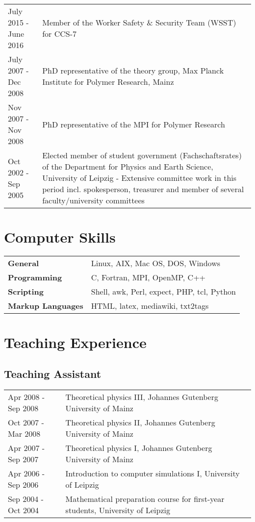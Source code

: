 \documentclass{article}
\begin{document}
\begin{tabular}{p{}p{}}
July 2015 - June 2016 & Member of the Worker Safety \& Security Team (WSST) for CCS-7 \\
July 2007 - Dec 2008 & PhD representative of the theory group, Max Planck Institute for Polymer Research, Mainz \\
Nov 2007 - Nov 2008 & PhD representative of the MPI for Polymer Research \\
Oct 2002 - Sep 2005 & Elected member of student government (Fachschaftsrates) of the Department for Physics and Earth Science, University of Leipzig - Extensive committee work in this period incl. spokesperson, treasurer and member of several faculty/university committees \\
\end{tabular}


\section*{Computer Skills}

\begin{tabular}{ll}
\textbf{General} & Linux, AIX, Mac OS, DOS, Windows \\
\textbf{Programming} & C, Fortran, MPI, OpenMP, C++ \\
\textbf{Scripting} & Shell, awk, Perl, expect, PHP, tcl, Python\\
\textbf{Markup Languages} & HTML, latex, mediawiki, txt2tags \\
\end{tabular}

\section*{Teaching Experience}

\subsection*{Teaching Assistant}

\begin{tabular}{p{}p{}}
Apr 2008 - Sep 2008 & Theoretical physics III, Johannes Gutenberg University of Mainz \\
Oct 2007 - Mar 2008 & Theoretical physics II, Johannes Gutenberg University of Mainz \\
Apr 2007 - Sep 2007 & Theoretical physics I, Johannes Gutenberg University of Mainz \\
Apr 2006 - Sep 2006 & Introduction to computer simulations I, University of Leipzig \\
Sep 2004 - Oct 2004 & Mathematical preparation course for first-year students, University of Leipzig \\
\end{tabular}
\end{document}
